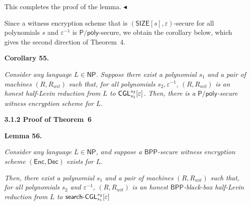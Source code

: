 \documentclass[10pt,a4paper]{article}
\begin{document}
This completes the proof of the lemma.
$\blacktriangleleft$\par




Since a witness encryption scheme that is $({\mathsf{SIZE}}[s],\varepsilon)$-secure for all polynomials $s$ and $\varepsilon^{-1}$ is ${\mathsf{P}}/{\mathsf{poly}}$-secure, we obtain the corollary below, which gives the second direction of Theorem 4.\par





\par\medskip\noindent\textbf{
\textbf{Corollary 55}\textbf{.}
}\par



\emph{Consider any language $L\in{\mathsf{NP}}$. Suppose there exist a polynomial $s_{1}$ and a pair of machines $(R,R_{wit})$ such that, for all polynomials $s_{2},\varepsilon^{-1}$, $(R,R_{wit})$ is an honest half-Levin reduction from $L$ to ${\sf CGL}^{s_{2}}_{s_{1}}[\varepsilon]$. Then, there is a ${\mathsf{P}}/{\mathsf{poly}}$-secure witness encryption scheme for $L$.}\par








\par\medskip\noindent\textbf{
3.1.2 Proof of Theorem 6
}\par





\par\medskip\noindent\textbf{
\textbf{Lemma 56}\textbf{.}
}\par



\emph{Consider any language $L\in{\mathsf{NP}}$, and suppose a ${\mathsf{BPP}}$-secure witness encryption scheme $({\mathsf{Enc}},{\mathsf{Dec}})$ exists for $L$.}\par




\emph{Then, there exist a polynomial $s_{1}$ and a pair of machines $(R,R_{wit})$ such that, for all polynomials $s_{2}$ and $\varepsilon^{-1}$, $(R,R_{wit})$ is an honest ${\mathsf{BPP}}$-black-box half-Levin reduction from $L$ to ${\sf search}\text{-}{\sf CGL}^{s_{2}}_{s_{1}}[\varepsilon]$}\par
\end{document}
